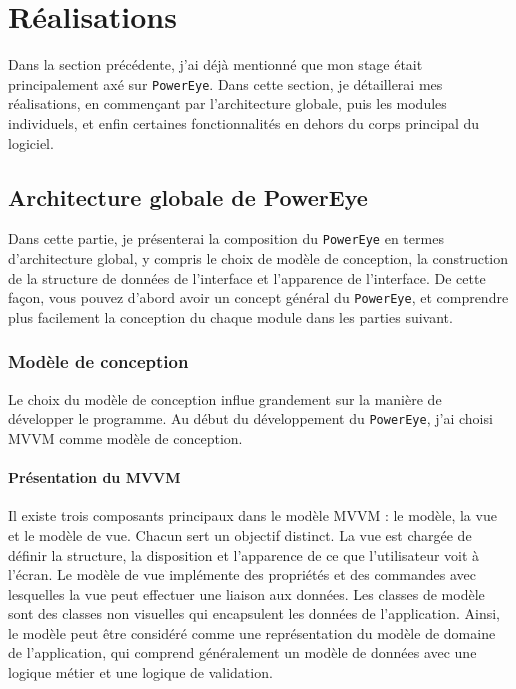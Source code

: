 \chapter{Réalisations}
Dans la section précédente, j'ai déjà mentionné que mon stage était principalement axé sur \texttt{PowerEye}. Dans cette section, je détaillerai mes réalisations, en commençant par l'architecture globale, puis les modules individuels, et enfin certaines fonctionnalités en dehors du corps principal du logiciel.
\section{Architecture globale de PowerEye}
Dans cette partie, je présenterai la composition du \texttt{PowerEye} en termes d'architecture global, y compris le choix de modèle de conception, la construction de la structure de données de l'interface et l'apparence de l'interface. De cette façon, vous pouvez d'abord avoir un concept général du \texttt{PowerEye}, et comprendre plus facilement la conception du chaque module dans les parties suivant.
\subsection{Modèle de conception}
Le choix du modèle de conception influe grandement sur la manière de développer le programme. Au début du développement du \texttt{PowerEye}, j'ai choisi MVVM comme modèle de conception.
\subsubsection{Présentation du MVVM}
Il existe trois composants principaux dans le modèle MVVM : le modèle, la vue et le modèle de vue. Chacun sert un objectif distinct. La vue est chargée de définir la structure, la disposition et l’apparence de ce que l’utilisateur voit à l’écran. Le modèle de vue implémente des propriétés et des commandes avec lesquelles la vue peut effectuer une liaison aux données. Les classes de modèle sont des classes non visuelles qui encapsulent les données de l’application. Ainsi, le modèle peut être considéré comme une représentation du modèle de domaine de l’application, qui comprend généralement un modèle de données avec une logique métier et une logique de validation. \\
